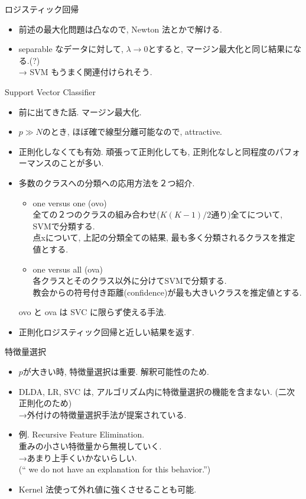 \documentclass[dvipdfmx,8pt]{beamer}
\begin{document}
  \begin{frame}{ロジスティック回帰}
    \begin{itemize}
      \item 前述の最大化問題は凸なので, Newton 法とかで解ける.
      \item separable なデータに対して, $\lambda\to 0$とすると, マージン最大化と同じ結果になる.(?) \\
        → SVM もうまく関連付けられそう.
    \end{itemize}
  \end{frame}
  \begin{frame}{Support Vector Classifier}
    \begin{itemize}
      \item 前に出てきた話. マージン最大化.
      \item $p \gg N$のとき, ほぼ確で線型分離可能なので, attractive.
      \item 正則化しなくても有効. 頑張って正則化しても, 正則化なしと同程度のパフォーマンスのことが多い.
      \item 多数のクラスへの分類への応用方法を２つ紹介.
        \begin{itemize}
          \item one versus one (ovo)\\
            全ての２つのクラスの組み合わせ($K(K-1)/2$通り)全てについて, SVMで分類する. \\
            点xについて, 上記の分類全ての結果, 最も多く分類されるクラスを推定値とする.
          \item one versus all (ova)\\
            各クラスとそのクラス以外に分けてSVMで分類する. \\
            教会からの符号付き距離(confidence)が最も大きいクラスを推定値とする.
        \end{itemize}
        ovo と ova は SVC に限らず使える手法.
      \item 正則化ロジスティック回帰と近しい結果を返す.
    \end{itemize}
  \end{frame}
  \begin{frame}{特徴量選択}
    \begin{itemize}
      \item $p$が大きい時, 特徴量選択は重要. 解釈可能性のため.
      \item DLDA, LR, SVC は, アルゴリズム内に特徴量選択の機能を含まない. (二次正則化のため)\\
        →外付けの特徴量選択手法が提案されている.
      \item 例. Recursive Feature Elimination.\\
        重みの小さい特徴量から無視していく. \\
        →あまり上手くいかないらしい. \\
        (`` we do not have an explanation for this behavior.'')
      \item Kernel 法使って外れ値に強くさせることも可能.
    \end{itemize}
  \end{frame}
\end{document}
